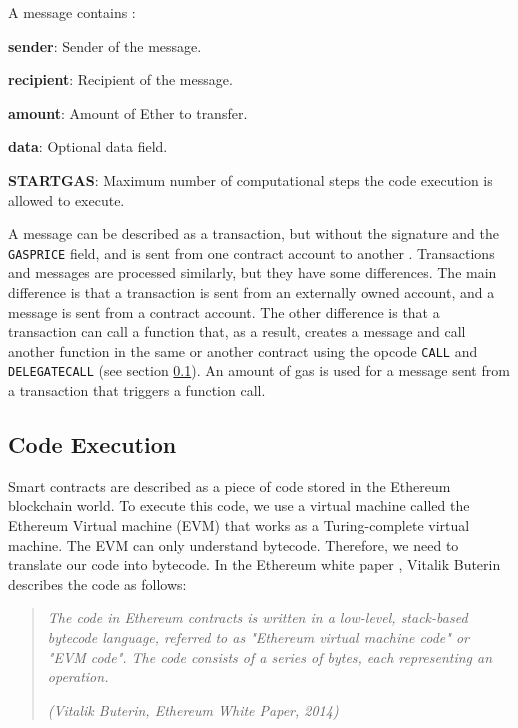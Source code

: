 A message contains :


\begin{list}{-}{}
   \item \textbf{sender}: Sender of the message.
   \item \textbf{recipient}: Recipient of the message.
   \item \textbf{amount}: Amount of Ether to transfer.
   \item \textbf{data}: Optional data field.
   \item \textbf{STARTGAS}: Maximum number of computational steps the code execution is allowed to execute.
\end{list}


A message can be described as a transaction, but without the signature and the \texttt{GASPRICE} field, and is sent from one contract account to another
. Transactions and messages are processed similarly, but they have some differences. The main difference
is that a transaction is sent from an externally owned account, and a message is sent from a contract account. The other difference is that a transaction
can call a function that, as a result, creates a message and call another function in the same or another contract using the opcode \texttt{CALL} and \texttt{DELEGATECALL}
(see section \ref{sec:evm}). An amount of gas is used for a message sent from a transaction that triggers a function call.


\subsection{Code Execution}
\label{sec:evm}

Smart contracts are described as a piece of code stored in the Ethereum blockchain world. To execute this code, we use a virtual machine called the Ethereum Virtual 
machine (EVM) that works as a Turing-complete virtual machine. The EVM can only understand bytecode. Therefore, we need to translate our code into bytecode.
In the Ethereum white paper \cite{ethereum_white_paper}, Vitalik Buterin describes the code as follows:

\begin{quote}
   \textit{The code in Ethereum contracts is written in a low-level, stack-based bytecode language, referred to as "Ethereum virtual machine code" or "EVM code". The code consists of a series of bytes, each representing an operation.}

   \textit{(Vitalik Buterin, Ethereum White Paper, 2014)}
\end{quote}


